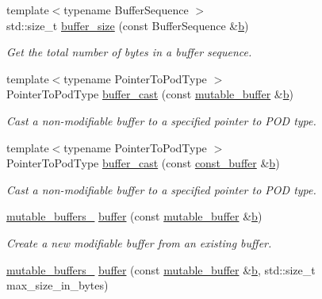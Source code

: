 \begin{DoxyCompactItemize}
{\footnotesize template$<$typename Buffer\+Sequence $>$ }\\std\+::size\+\_\+t \hyperlink{group__buffer__size_ga2a60e9305e8e7193de581172f360657b}{buffer\+\_\+size} (const Buffer\+Sequence \&\hyperlink{group__async__read_ga945a5c18fa77a9e2eba420f8f44b2a4f}{b})
\begin{DoxyCompactList}\small\item\em Get the total number of bytes in a buffer sequence. \end{DoxyCompactList}\item 
{\footnotesize template$<$typename Pointer\+To\+Pod\+Type $>$ }\\Pointer\+To\+Pod\+Type \hyperlink{group__buffer__cast_ga6faa5f9daa2512cc9c3cefa8b5ab0704}{buffer\+\_\+cast} (const \hyperlink{classasio_1_1mutable__buffer}{mutable\+\_\+buffer} \&\hyperlink{group__async__read_ga945a5c18fa77a9e2eba420f8f44b2a4f}{b})
\begin{DoxyCompactList}\small\item\em Cast a non-\/modifiable buffer to a specified pointer to P\+O\+D type. \end{DoxyCompactList}\item 
{\footnotesize template$<$typename Pointer\+To\+Pod\+Type $>$ }\\Pointer\+To\+Pod\+Type \hyperlink{group__buffer__cast_ga0bc1fdf63b08b041819a9e18423ef630}{buffer\+\_\+cast} (const \hyperlink{classasio_1_1const__buffer}{const\+\_\+buffer} \&\hyperlink{group__async__read_ga945a5c18fa77a9e2eba420f8f44b2a4f}{b})
\begin{DoxyCompactList}\small\item\em Cast a non-\/modifiable buffer to a specified pointer to P\+O\+D type. \end{DoxyCompactList}\item 
\hyperlink{classasio_1_1mutable__buffers__1}{mutable\+\_\+buffers\+\_} \hyperlink{group__buffer_ga1ed66e401559cbfd19595392f653b47c}{buffer} (const \hyperlink{classasio_1_1mutable__buffer}{mutable\+\_\+buffer} \&\hyperlink{group__async__read_ga945a5c18fa77a9e2eba420f8f44b2a4f}{b})
\begin{DoxyCompactList}\small\item\em Create a new modifiable buffer from an existing buffer. \end{DoxyCompactList}\item 
\hyperlink{classasio_1_1mutable__buffers__1}{mutable\+\_\+buffers\+\_} \hyperlink{group__buffer_gaf93a06eac8bd6d1db394ba92e260b9fa}{buffer} (const \hyperlink{classasio_1_1mutable__buffer}{mutable\+\_\+buffer} \&\hyperlink{group__async__read_ga945a5c18fa77a9e2eba420f8f44b2a4f}{b}, std\+::size\+\_\+t max\+\_\+size\+\_\+in\+\_\+bytes)

\end{DoxyCompactItemize}
